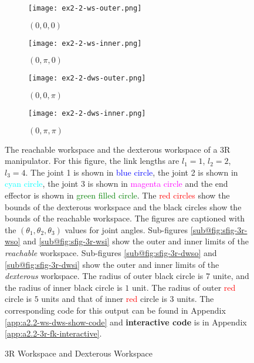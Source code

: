 \begin{figure}[!ht]
    \centering
    \begin{subfigure}[b]{0.45\textwidth}
        \centering
        \texttt{[image: ex2-2-ws-outer.png]}
        \caption{$(0, 0, 0)$}
        \label{fig:sfig-3r-wso}
    \end{subfigure}
    \begin{subfigure}[b]{0.45\textwidth}
        \centering
        \texttt{[image: ex2-2-ws-inner.png]}
        \caption{$(0, \pi, 0)$}
        \label{fig:sfig-3r-wsi}
    \end{subfigure}
    \begin{subfigure}[b]{0.45\textwidth}
        \centering
        \texttt{[image: ex2-2-dws-outer.png]}
        \caption{$(0, 0, \pi)$}
        \label{fig:sfig-3r-dwso}
    \end{subfigure}
    \begin{subfigure}[b]{0.45\textwidth}
        \centering
        \texttt{[image: ex2-2-dws-inner.png]}
        \caption{$(0, \pi, \pi)$}
        \label{fig:sfig-3r-dwsi}
    \end{subfigure}
    \caption{3R Workspace and Dexterous Workspace}
    \small
        The reachable workspace and the dexterous workspace of a 3R manipulator. For this figure, the link lengths are $l_1 = 1$, $l_2 = 2$, $l_3 = 4$. 
        The joint 1 is shown in \textcolor{blue}{blue circle}, the joint 2 is shown in \textcolor{cyan}{cyan circle}, the joint 3 is shown in \textcolor{magenta}{magenta circle} and the end effector is shown in \textcolor{Green}{green filled circle}. 
        The \textcolor{red}{red circles} show the bounds of the dexterous workspace and the black circles show the bounds of the reachable workspace. 
        The figures are captioned with the $(\theta_1, \theta_2, \theta_3)$ values for joint angles. 
        Sub-figures \ref{sub@fig:sfig-3r-wso} and \ref{sub@fig:sfig-3r-wsi} show the outer and inner limits of the \emph{reachable} workspace. Sub-figures \ref{sub@fig:sfig-3r-dwso} and \ref{sub@fig:sfig-3r-dwsi} show the outer and inner limits of the \emph{dexterous} workspace.
        The radius of outer black circle is $7$ unite, and the radius of inner black circle is $1$ unit. The radius of outer \textcolor{red}{red} circle is $5$ units and that of inner \textcolor{red}{red} circle is $3$ units.
        The corresponding code for this output can be found in Appendix \ref{app:a2.2-ws-dws-show-code} and \textbf{interactive code} is in Appendix \ref{app:a2.2-3r-fk-interactive}.
    \label{fig:3r-ws-dws}
\end{figure}
